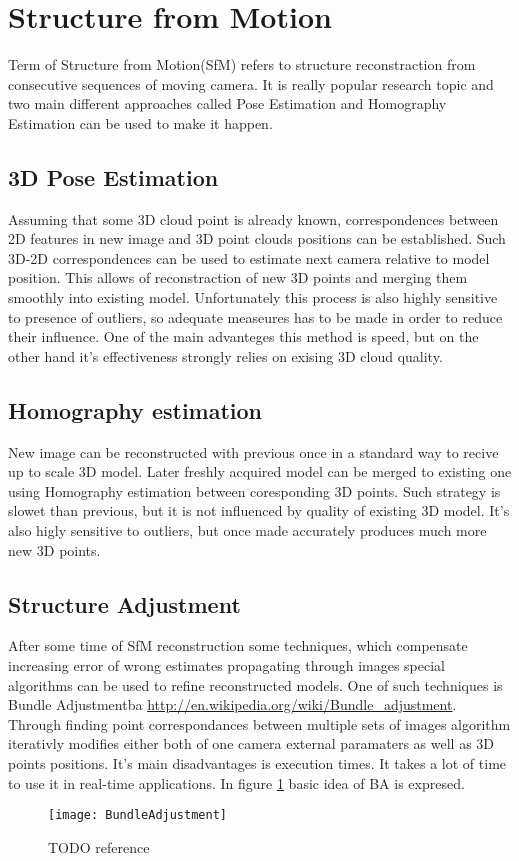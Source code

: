 \section{Structure from Motion}
Term of Structure from Motion(SfM) refers to structure reconstraction from consecutive sequences of moving camera. It is really popular research topic and two main different approaches called Pose Estimation and Homography Estimation can be used to make it happen.
\subsection{3D Pose Estimation}
Assuming that some 3D cloud point is already known, correspondences between 2D features in new image and 3D point clouds positions can be established. Such 3D-2D correspondences can be used to estimate next camera relative to model position. This allows of reconstraction of new 3D points and merging them smoothly into existing model. Unfortunately this process is also highly sensitive to presence of outliers, so adequate measeures has to be made in order to reduce their influence. One of the main advanteges this method is speed, but on the other hand it's effectiveness strongly relies on exising 3D cloud quality. 
\subsection{Homography estimation}
New image can be reconstructed with previous once in a standard way to recive up to scale 3D model. Later freshly acquired model can be merged to existing one using Homography estimation between coresponding 3D points. Such strategy is slowet than previous, but it is not influenced by quality of existing 3D model. It's also higly sensitive to outliers, but once made accurately produces much more new 3D points.
\subsection{Structure Adjustment}
After some time of SfM reconstruction some techniques, which compensate increasing error of wrong estimates propagating through images special algorithms can be used to refine reconstructed models. One of such techniques is Bundle Adjustment\gls{ba} \url{http://en.wikipedia.org/wiki/Bundle_adjustment}. Through finding point correspondances between multiple sets of images algorithm iterativly modifies either both of one camera external paramaters as well as 3D points positions. It's main disadvantages is execution times. It takes a lot of time to use it in real-time applications. In figure \ref{fig:BundleAdjustment} basic idea of BA is expresed.
\begin{figure}[p]
    \centering
    \texttt{[image: BundleAdjustment]}
    \caption{TODO reference}
    \label{fig:BundleAdjustment}
\end{figure}

